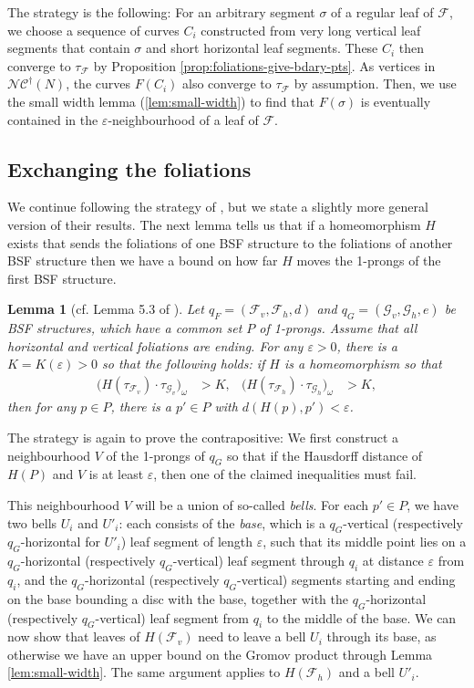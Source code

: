 \documentclass[a4paper]{article}
\let\epsilon\varepsilon %
\newtheorem{lemma}[theorem]{Lemma}
\newcommand{\fncg}{\mathcal{NC}^\dagger}
\begin{document}
The strategy is the following:
For an arbitrary segment $\sigma$ of a regular leaf of $\mathcal{F}$, we choose a sequence of curves $C_i$ constructed from very long vertical leaf segments that contain $\sigma$ and short horizontal leaf segments.
These $C_i$ then converge to $\tau_\mathcal{F}$ by Proposition \ref{prop:foliations-give-bdary-pts}.
As vertices in $\fncg(N)$, the curves $F(C_i)$ also converge to $\tau_\mathcal{F}$ by assumption.
Then, we use the small width lemma (\ref{lem:small-width}) to find that $F(\sigma)$ is eventually contained in the $\epsilon$-neighbourhood of a leaf of $\mathcal{F}$.

\subsection{Exchanging the foliations}
We continue following the strategy of \cite{BHW2}, but we state a slightly more general version of their results.
The next lemma tells us that if a homeomorphism $H$ exists that sends the foliations of one BSF structure to the foliations of another BSF structure then we have a bound on how far $H$ moves the 1-prongs of the first BSF structure.

\begin{lemma}[cf. Lemma 5.3 of \cite{BHW2}]\label{lem:main-technical-lemma}
Let $q_F = (\mathcal{F}_v,\mathcal{F}_h,d)$ and $q_G = (\mathcal{G}_v,\mathcal{G}_h,e)$ be BSF structures, which have a common set $P$ of 1-prongs.
Assume that all horizontal and vertical foliations are ending.
For any $\epsilon > 0$, there is a $K=K(\epsilon) > 0$ so that the following holds:
if $H$ is a homeomorphism so that
\begin{align*}
    \big( H(\tau_{\mathcal{F}_v}) \cdot \tau_{\mathcal{G}_v} \big)_\omega &> K, & \big( H(\tau_{\mathcal{F}_h}) \cdot \tau_{\mathcal{G}_h} \big)_\omega &> K,
\end{align*}
then for any $p\in P$, there is a $p'\in P$ with $d(H(p),p') < \epsilon$.
\end{lemma}

The strategy is again to prove the contrapositive:
We first construct a neighbourhood $V$ of the 1-prongs of $q_G$ so that if the Hausdorff distance of $H(P)$ and $V$ is at least $\epsilon$, then one of the claimed inequalities must fail.

This neighbourhood $V$ will be a union of so-called \emph{bells}.
For each $p'\in P$, we have two bells $U_i$ and $U'_i$:
each consists of the \emph{base}, which is a $q_G$-vertical (respectively $q_G$-horizontal for $U'_i$) leaf segment of length $\epsilon$, such that its middle point lies on a $q_G$-horizontal (respectively $q_G$-vertical) leaf segment through $q_i$ at distance $\epsilon$ from $q_i$, and the $q_G$-horizontal (respectively $q_G$-vertical) segments starting and ending on the base bounding a disc with the base, together with the $q_G$-horizontal (respectively $q_G$-vertical) leaf segment from $q_i$ to the middle of the base.
We can now show that leaves of $H(\mathcal{F}_v)$ need to leave a bell $U_i$ through its base, as otherwise we have an upper bound on the Gromov product through Lemma \ref{lem:small-width}.
The same argument applies to $H(\mathcal{F}_h)$ and a bell $U'_i$.
\end{document}
